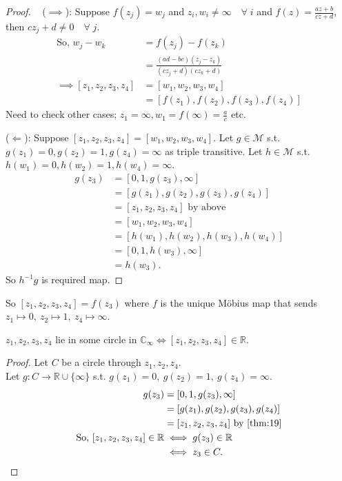 \begin{proof} ~
    ($\implies$): Suppose $f(z_j) = w_j$ and $z_i, w_i \neq \infty \quad \forall \; i$ and $f(z) = \frac{az + b}{cz + d}$, then $cz_j + d \neq 0 \quad \forall \; j$.
    \begin{align*}
        \text{So, } w_j - w_k &= f(z_j) - f(z_k) \\
        &= \frac{(ad - bc) (z_j - z_k)}{(c z_j + d) (c z_k + d)} \\
        \implies [z_1, z_2, z_3, z_4] &= [w_1, w_2, w_3, w_4] \\
        &=  [f(z_1), f(z_2), f(z_3), f(z_4)]
    \end{align*} 
    Need to check other cases; $z_1 = \infty, w_1 = f(\infty) = \frac{a}{c}$ etc.

    ($\Longleftarrow$): Suppose $[z_1, z_2, z_3, z_4] = [w_1, w_2, w_3, w_4]$.
    Let $g \in \mathcal{M}$ s.t. $g(z_1) = 0, g(z_2) = 1, g(z_4) = \infty$ as triple transitive.
    Let $h \in \mathcal{M}$ s.t. $h(w_1) = 0, h(w_2) = 1, h(w_4) = \infty$.
    \begin{align*}
        g(z_3) &= [0, 1, g(z_3), \infty] \\
        &= [g(z_1), g(z_2), g(z_3), g(z_4)] \\
        &= [z_1, z_2, z_3, z_4] \text{ by above} \\
        &= [w_1, w_2, w_3, w_4] \\
        &= [h(w_1), h(w_2), h(w_3), h(w_4)] \\
        &= [0, 1, h(w_3), \infty] \\
        &= h(w_3).
    \end{align*} 
    So $h^{-1}g$ is required map. 
\end{proof} 

So $[z_1, z_2, z_3, z_4] = f(z_3)$ where $f$ is the unique M\"obius map that sends $z_1 \mapsto 0,\ z_2 \mapsto 1,\ z_4 \mapsto \infty$.

\begin{corollary} \label{cor:9}
    $z_1, z_2, z_3, z_4$ lie in some circle in $\mathbb{C}_\infty \iff [z_1, z_2, z_3, z_4] \in \mathbb{R}$.
\end{corollary} 

\begin{proof}
    Let $C$ be a circle through $z_1, z_2, z_4$. \\
    Let $g : C \to \mathbb{R} \cup \{\infty\}$ s.t. $g(z_1) = 0,\ g(z_2) = 1,\ g(z_4) = \infty$.
    \begin{align*}
        g(z_3) &= [0, 1, g(z_3), \infty] \\
        &= [g(z_1), g(z_2), g(z_3), g(z_4)] \\
        &= [z_1, z_2, z_3, z_4] \text{ by \Cref{thm:19}} \\
        \text{So, } [z_1, z_2, z_3, z_4] \in \mathbb{R} &\iff g(z_3) \in \mathbb{R} \\
        &\iff z_3 \in C.
    \end{align*} 
\end{proof} 